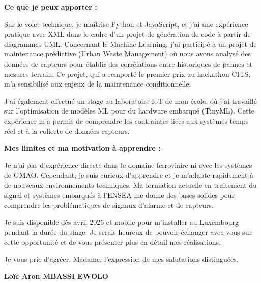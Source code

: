 \documentclass[a4paper,11pt]{article}
\begin{document}
\vspace{0.3cm}

\textbf{Ce que je peux apporter :}

\vspace{0.2cm}

Sur le volet technique, je maîtrise Python et JavaScript, et j'ai une expérience pratique avec XML dans le cadre d'un projet de génération de code à partir de diagrammes UML. Concernant le Machine Learning, j'ai participé à un projet de maintenance prédictive (Urban Waste Management) où nous avons analysé des données de capteurs pour établir des corrélations entre historiques de pannes et mesures terrain. Ce projet, qui a remporté le premier prix au hackathon CITS, m'a sensibilisé aux enjeux de la maintenance conditionnelle.

\vspace{0.2cm}

J'ai également effectué un stage au laboratoire IoT de mon école, où j'ai travaillé sur l'optimisation de modèles ML pour du hardware embarqué (TinyML). Cette expérience m'a permis de comprendre les contraintes liées aux systèmes temps réel et à la collecte de données capteurs.

\vspace{0.3cm}

\textbf{Mes limites et ma motivation à apprendre :}

\vspace{0.2cm}

Je n'ai pas d'expérience directe dans le domaine ferroviaire ni avec les systèmes de GMAO. Cependant, je suis curieux d'apprendre et je m'adapte rapidement à de nouveaux environnements techniques. Ma formation actuelle en traitement du signal et systèmes embarqués à l'ENSEA me donne des bases solides pour comprendre les problématiques de signaux d'alarme et de capteurs.

\vspace{0.3cm}

Je suis disponible dès avril 2026 et mobile pour m'installer au Luxembourg pendant la durée du stage. Je serais heureux de pouvoir échanger avec vous sur cette opportunité et de vous présenter plus en détail mes réalisations.

\vspace{0.5cm}

\noindent
Je vous prie d'agréer, Madame, l'expression de mes salutations distinguées.

\vspace{0.5cm}

\noindent
\textbf{Loïc Aron MBASSI EWOLO}
\end{document}
